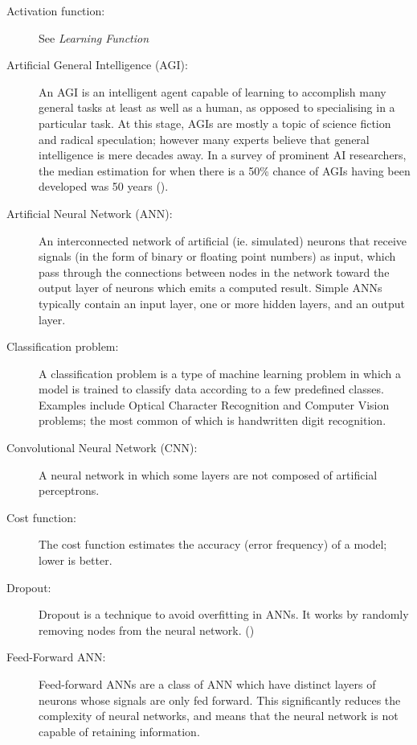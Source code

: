 \documentclass[]{report}
\begin{document}
\begin{description}
\item[Activation function:] See \textit{Learning Function}

\item[Artificial General Intelligence (AGI):] An AGI is an intelligent agent capable of learning to accomplish many general tasks at least as well as a human, as opposed to specialising in a particular task. At this stage, AGIs are mostly a topic of science fiction and radical speculation; however many experts believe that general intelligence is mere decades away. In a survey of prominent AI researchers, the median estimation for when there is a 50\% chance of AGIs having been developed was 50 years (\cite{grace2017will}).

\item[Artificial Neural Network (ANN):] An interconnected network of artificial (ie. simulated) neurons that receive signals (in the form of binary or floating point numbers) as input, which pass through the connections between nodes in the network toward the output layer of neurons which emits a computed result. Simple ANNs typically contain an input layer, one or more hidden layers, and an output layer.

\item[Classification problem:] A classification problem is a type of machine learning problem in which a model is trained to classify data according to a few predefined classes. Examples include Optical Character Recognition and Computer Vision problems; the most common of which is handwritten digit recognition.

\item[Convolutional Neural Network (CNN):] A neural network in which some layers are not composed of artificial perceptrons.

\item[Cost function:] The cost function estimates the accuracy (error frequency) of a model; lower is better.

\item[Dropout:] Dropout is a technique to avoid overfitting in ANNs. It works by randomly removing nodes from the neural network. (\cite{dropout14})

\item[Feed-Forward ANN:] Feed-forward ANNs are a class of ANN which have distinct layers of neurons whose signals are only fed forward. This significantly reduces the complexity of neural networks, and means that the neural network is not capable of retaining information.


\end{description}
\end{document}
